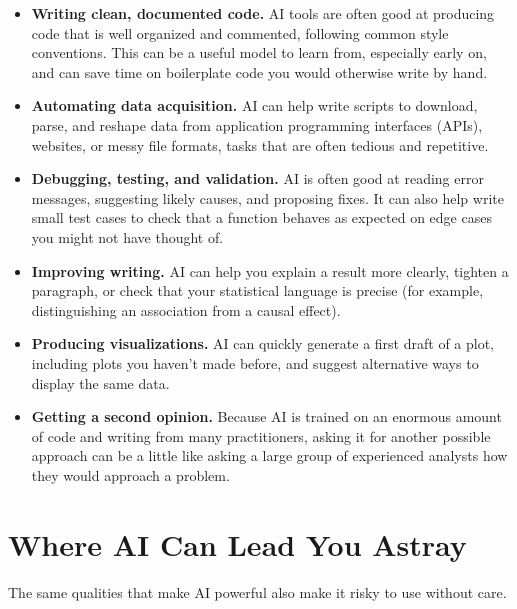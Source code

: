 \begin{itemize}
\item \textbf{Writing clean, documented code.} AI tools are often good at
  producing code that is well organized and commented, following
  common style conventions. This can be a useful model to learn from,
  especially early on, and can save time on boilerplate code you would
  otherwise write by hand.
\item \textbf{Automating data acquisition.} AI can help write scripts
  to download, parse, and reshape data from application programming
  interfaces (APIs), websites, or messy file formats, tasks that are
  often tedious and repetitive.
\item \textbf{Debugging, testing, and validation.} AI is often good at
  reading error messages, suggesting likely causes, and proposing
  fixes. It can also help write small test cases to check that a
  function behaves as expected on edge cases you might not have
  thought of.
\item \textbf{Improving writing.} AI can help you explain a result
  more clearly, tighten a paragraph, or check that your statistical
  language is precise (for example, distinguishing an association from
  a causal effect).
\item \textbf{Producing visualizations.} AI can quickly generate a
  first draft of a plot, including plots you haven't made before, and
  suggest alternative ways to display the same data.
\item \textbf{Getting a second opinion.} Because AI is trained on an
  enormous amount of code and writing from many practitioners, asking
  it for another possible approach can be a little like asking a large
  group of experienced analysts how they would approach a problem.
\end{itemize}

\section{Where AI Can Lead You Astray}

The same qualities that make AI powerful also make it risky to use
without care.

